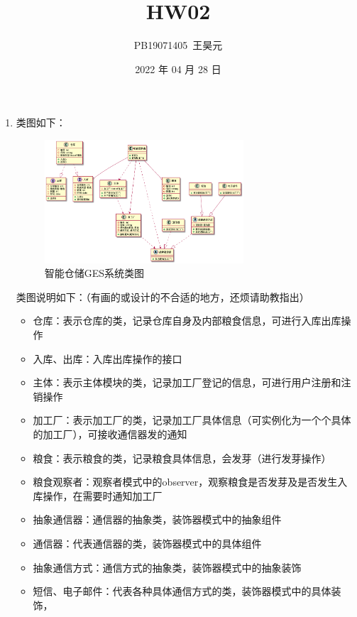 \documentclass{article}
\title{HW02}
\author{PB19071405\ 王昊元}
\date{2022 年 04 月 28 日}
\begin{document}
    \maketitle

    \begin{enumerate}[label=\arabic*.]
        \item 类图如下：\\
        \begin{figure}[H]
            \centering
            \includegraphics[width=0.7\textwidth]{./fig/hw02/1.png}
            \caption{智能仓储GES系统类图}
        \end{figure}
        类图说明如下：（有画的或设计的不合适的地方，还烦请助教指出）\\
        \begin{itemize}
            \item 仓库：表示仓库的类，记录仓库自身及内部粮食信息，可进行入库出库操作
            \item 入库、出库：入库出库操作的接口
            \item 主体：表示主体模块的类，记录加工厂登记的信息，可进行用户注册和注销操作
            \item 加工厂：表示加工厂的类，记录加工厂具体信息（可实例化为一个个具体的加工厂），可接收通信器发的通知
            \item 粮食：表示粮食的类，记录粮食具体信息，会发芽（进行发芽操作）
            \item 粮食观察者：观察者模式中的observer，观察粮食是否发芽及是否发生入库操作，在需要时通知加工厂
            \item 抽象通信器：通信器的抽象类，装饰器模式中的抽象组件
            \item 通信器：代表通信器的类，装饰器模式中的具体组件
            \item 抽象通信方式：通信方式的抽象类，装饰器模式中的抽象装饰
            \item 短信、电子邮件：代表各种具体通信方式的类，装饰器模式中的具体装饰，

\end{itemize}
\end{enumerate}
\end{document}
